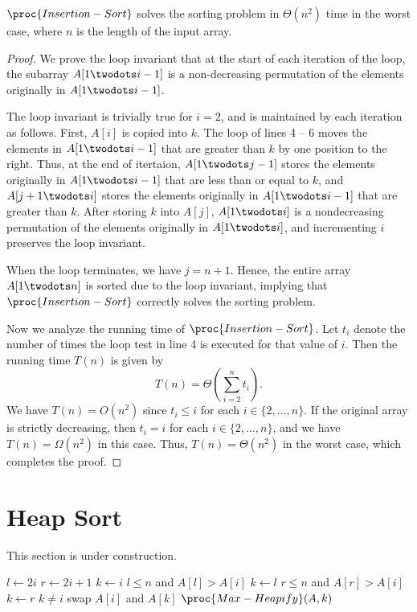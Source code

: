 \begin{theorem}
  $\proc{Insertion-Sort}$ solves the sorting problem in $\Theta(n^2)$ time in
  the worst case, where $n$ is the length of the input array.
\end{theorem}
\begin{proof}
  We prove the loop invariant that at the start of each iteration of the \For
  loop, the subarray $A[1 \twodots i-1]$ is a non-decreasing permutation of the
  elements originally in $A[1 \twodots i-1]$.

  The loop invariant is trivially true for $i = 2$, and is maintained by each
  iteration as follows.
  First, $A[i]$ is copied into $k$.
  The \While loop of lines 4 -- 6 moves the elements in $A[1 \twodots i-1]$
  that are greater than $k$ by one position to the right.
  Thus, at the end of itertaion, $A[1 \twodots j-1]$ stores the elements
  originally in $A[1 \twodots i-1]$ that are less than or equal to $k$, and
  $A[j+1 \twodots i]$ stores the elements originally in $A[1 \twodots i-1]$
  that are greater than $k$.
  After storing $k$ into $A[j]$, $A[1 \twodots i]$ is a nondecreasing
  permutation of the elements originally in $A[1 \twodots i]$, and incrementing
  $i$ preserves the loop invariant.

  When the \For loop terminates, we have $j = n + 1$.
  Hence, the entire array $A[1 \twodots n]$ is sorted due to the loop
  invariant, implying that $\proc{Insertion-Sort}$ correctly solves the sorting
  problem.

  Now we analyze the running time of $\proc{Insertion-Sort}$.
  Let $t_i$ denote the number of times the \While loop test in line 4 is
  executed for that value of $i$.
  Then the running time $T(n)$ is given by
  \begin{equation*}
    T(n) = \Theta\left(\sum_{i=2}^n t_i\right).
  \end{equation*}
  We have $T(n) = O(n^2)$ since $t_i \leq i$ for each $i \in \{2, \dots, n\}$.
  If the original array is strictly decreasing, then $t_i = i$ for each $i \in
  \{2, \dots, n\}$, and we have $T(n) = \Omega(n^2)$ in this case.
  Thus, $T(n)  = \Theta(n^2)$ in the worst case, which completes the proof.
\end{proof}

\section{Heap Sort}
This section is under construction.
\begin{codebox}
  \li $l \gets 2i$
  \li $r \gets 2i + 1$
  \li $k \gets i$
  \li \If $l \leq n$ and $A[l] > A[i]$ \Then
  \li     $k \gets l$
      \End
  \li \If $r \leq n$ and $A[r] > A[i]$ \Then
  \li     $k \gets r$
      \End
  \li \If $k \neq i$ \Then
  \li     swap $A[i]$ and $A[k]$
  \li     $\proc{Max-Heapify}(A, k)$
      \End
\end{codebox}

